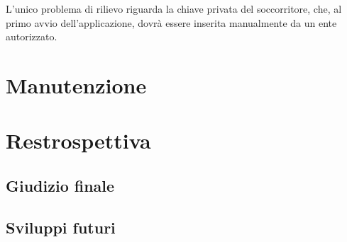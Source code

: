 \documentclass[a4paper,12pt]{report}
\begin{document}
L'unico problema di rilievo riguarda la chiave privata del soccorritore, che, al primo avvio dell'applicazione, dovrà essere inserita manualmente da un ente autorizzato. 

\chapter{Manutenzione}

\chapter{Restrospettiva}
\section{Giudizio finale}
\section{Sviluppi futuri}

 
\end{document}

